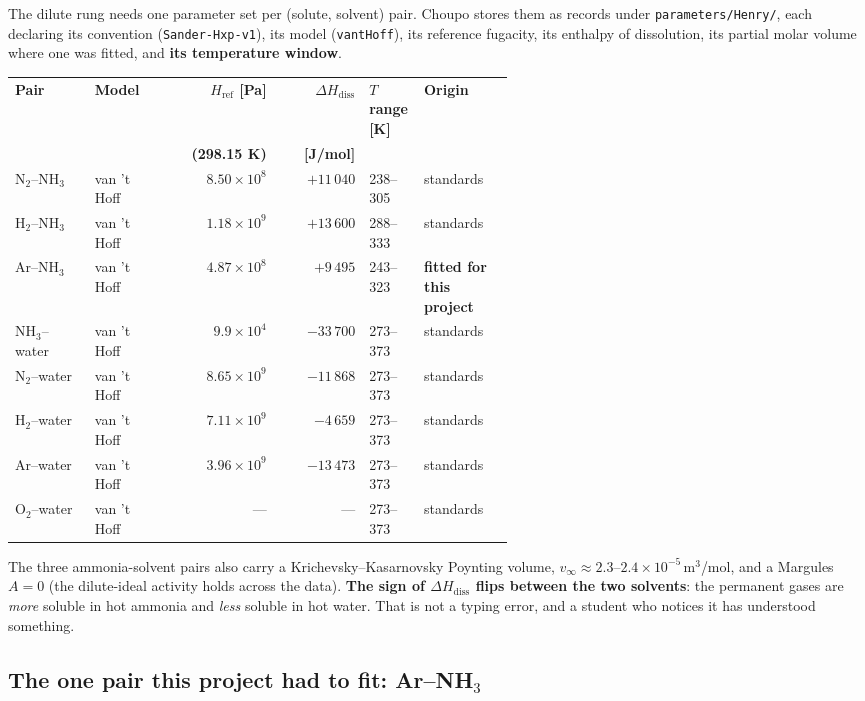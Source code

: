 \documentclass[11pt,a4paper]{article}
\begin{document}
The dilute rung needs one parameter set per (solute, solvent) pair. Choupo
stores them as records under \texttt{parameters/Henry/}, each declaring its
convention (\texttt{Sander-Hxp-v1}), its model (\texttt{vantHoff}), its
reference fugacity, its enthalpy of dissolution, its partial molar volume where
one was fitted, and \textbf{its temperature window}.

{\small\begin{longtable}{@{}L{0.16\linewidth}L{0.13\linewidth}rrL{0.11\linewidth}L{0.18\linewidth}@{}}
\toprule
\textbf{Pair} & \textbf{Model} & \textbf{$H_{\mathrm{ref}}$ [Pa]} &
  \textbf{$\Delta H_{\mathrm{diss}}$} & \textbf{$T$ range [K]} &
  \textbf{Origin} \\
 & & \textbf{(298.15 K)} & \textbf{[J/mol]} & & \\
\midrule
\endhead
N$_2$--NH$_3$  & van 't Hoff & $8.50\times10^{8}$ & $+11\,040$ & 238--305 & standards \\
H$_2$--NH$_3$  & van 't Hoff & $1.18\times10^{9}$ & $+13\,600$ & 288--333 & standards \\
Ar--NH$_3$     & van 't Hoff & $4.87\times10^{8}$ & $+9\,495$  & 243--323 & \textbf{fitted for this project} \\
NH$_3$--water  & van 't Hoff & $9.9\times10^{4}$  & $-33\,700$ & 273--373 & standards \\
N$_2$--water   & van 't Hoff & $8.65\times10^{9}$ & $-11\,868$ & 273--373 & standards \\
H$_2$--water   & van 't Hoff & $7.11\times10^{9}$ & $-4\,659$  & 273--373 & standards \\
Ar--water      & van 't Hoff & $3.96\times10^{9}$ & $-13\,473$ & 273--373 & standards \\
O$_2$--water   & van 't Hoff & --- & --- & 273--373 & standards \\
\bottomrule
\end{longtable}}

The three ammonia-solvent pairs also carry a Krichevsky--Kasarnovsky Poynting
volume, $v_\infty \approx 2.3$--$2.4\times10^{-5}$\,m$^3$/mol, and a Margules
$A = 0$ (the dilute-ideal activity holds across the data). \textbf{The sign of
$\Delta H_{\mathrm{diss}}$ flips between the two solvents}: the permanent gases
are \emph{more} soluble in hot ammonia and \emph{less} soluble in hot water.
That is not a typing error, and a student who notices it has understood
something.

\subsection{The one pair this project had to fit: Ar--NH$_3$}
\end{document}

